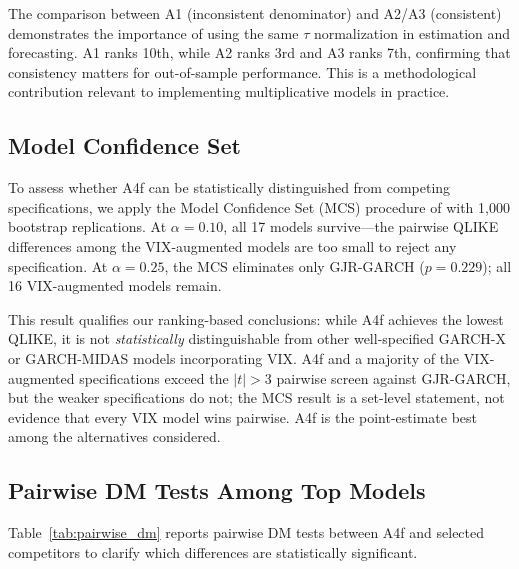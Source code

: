 \documentclass[12pt,a4paper]{article}
\begin{document}
The comparison between A1 (inconsistent denominator) and A2/A3 (consistent) demonstrates the importance of using the same $\tau$ normalization in estimation and forecasting. A1 ranks 10th, while A2 ranks 3rd and A3 ranks 7th, confirming that consistency matters for out-of-sample performance. This is a methodological contribution relevant to implementing multiplicative models in practice.

\subsection{Model Confidence Set}

To assess whether A4f can be statistically distinguished from competing specifications, we apply the Model Confidence Set (MCS) procedure of \citet{hansen2011} with 1,000 bootstrap replications. At $\alpha = 0.10$, all 17 models survive---the pairwise QLIKE differences among the VIX-augmented models are too small to reject any specification. At $\alpha = 0.25$, the MCS eliminates only GJR-GARCH ($p = 0.229$); all 16 VIX-augmented models remain.

This result qualifies our ranking-based conclusions: while A4f achieves the lowest QLIKE, it is not \emph{statistically} distinguishable from other well-specified GARCH-X or GARCH-MIDAS models incorporating VIX. A4f and a majority of the VIX-augmented specifications exceed the $|t|>3$ pairwise screen against GJR-GARCH, but the weaker specifications do not; the MCS result is a set-level statement, not evidence that every VIX model wins pairwise. A4f is the point-estimate best among the alternatives considered.

\subsection{Pairwise DM Tests Among Top Models}

Table~\ref{tab:pairwise_dm} reports pairwise DM tests between A4f and selected competitors to clarify which differences are statistically significant.
\end{document}
